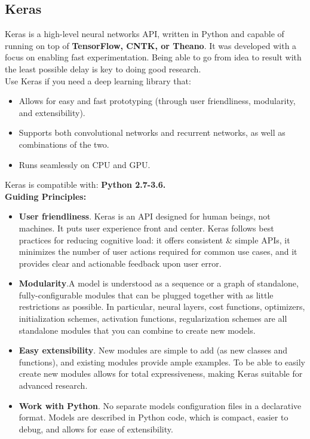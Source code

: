 \subsection{Keras}
Keras is a high-level neural networks API, written in Python and capable of running on top of \textbf{TensorFlow, CNTK, or Theano}. It was developed with a focus on enabling fast experimentation. Being able to go from idea to result with the least possible delay is key to doing good research.
\\
Use Keras if you need a deep learning library that:
\begin{itemize}
	\item Allows for easy and fast prototyping (through user friendliness, modularity, and extensibility).
	\item Supports both convolutional networks and recurrent networks, as well as combinations of the two.
	\item Runs seamlessly on CPU and GPU.
\end{itemize}
Keras is compatible with: \textbf{Python 2.7-3.6.}
\\
\textbf{Guiding Principles:}
\begin{itemize}
	\item \textbf{User friendliness}. Keras is an API designed for human beings, not machines. It puts user experience front and center. Keras follows best practices for reducing cognitive load: it offers consistent \& simple APIs, it minimizes the number of user actions required for common use cases, and it provides clear and actionable feedback upon user error.
	\item \textbf{Modularity}.A model is understood as a sequence or a graph of standalone, fully-configurable modules that can be plugged together with as little restrictions as possible. In particular, neural layers, cost functions, optimizers, initialization schemes, activation functions, regularization schemes are all standalone modules that you can combine to create new models.
	\item \textbf{Easy extensibility}. New modules are simple to add (as new classes and functions), and existing modules provide ample examples. To be able to easily create new modules allows for total expressiveness, making Keras suitable for advanced research.
	\item \textbf{Work with Python}. No separate models configuration files in a declarative format. Models are described in Python code, which is compact, easier to debug, and allows for ease of extensibility.
\end{itemize}

